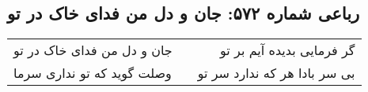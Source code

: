 \begin{center}
\section*{رباعی شماره ۵۷۲: جان و دل من فدای خاک در تو}
\label{sec:sh572}
\begin{longtable}{l p{0.5cm} r}
جان و دل من فدای خاک در تو
&&
گر فرمایی بدیده آیم بر تو
\\
وصلت گوید که تو نداری سرما
&&
بی سر بادا هر که ندارد سر تو
\\
\end{longtable}
\end{center}
